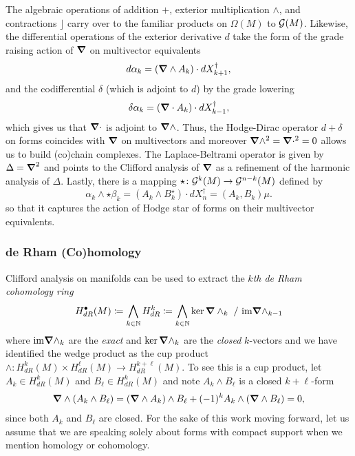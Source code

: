 \documentclass[conf]{new-aiaa}
\begin{document}
The algebraic operations of addition $+$, exterior multiplication $\wedge$, and contractions $\rfloor$ carry over to the familiar products on $\Omega(M)$ to $\mathcal{G}(M)$. Likewise, the differential operations of the exterior derivative $d$ take the form of the grade raising action of $\boldsymbol{\nabla}$ on multivector equivalents
\begin{equation}
d \alpha_k = (\boldsymbol{\nabla} \wedge A_k) \cdot dX_{k+1}^\dagger,
\end{equation}
and the codifferential $\delta$ (which is adjoint to $d$) by the grade lowering
\begin{equation}
\delta \alpha_k = (\boldsymbol{\nabla} \cdot A_k)\cdot dX_{k-1}^\dagger,
\end{equation} 
which gives us that $\boldsymbol{\nabla} \cdot$ is adjoint to $\boldsymbol{\nabla} \wedge$. Thus, the Hodge-Dirac operator $d+\delta$ on forms coincides with $\boldsymbol{\nabla}$ on multivectors and moreover $\boldsymbol{\nabla} \wedge^2 = \boldsymbol{\nabla} \cdot^2=0$ allows us to build (co)chain complexes. The Laplace-Beltrami operator is given by $\Delta = \boldsymbol{\nabla}^2$ and points to the Clifford analysis of $\boldsymbol{\nabla}$ as a refinement of the harmonic analysis of $\Delta$. Lastly, there is a mapping $\star \colon \mathcal{G}^k(M)\to \mathcal{G}^{n-k}(M)$ defined by
\begin{equation}
\alpha_k \wedge \star \beta_k = (A_k \wedge B_k^{\star})\cdot dX_n^\dagger = (A_k,B_k) \mu.
\end{equation}
so that it captures the action of Hodge star of forms on their multivector equivalents. 

\subsubsection{de Rham (Co)homology}

\label{subsubsec:derham}

Clifford analysis on manifolds can be used to extract the \emph{$k$th de Rham cohomology ring}
\begin{equation}
H^\bullet_{dR}(M) \coloneqq \bigwedge_{k \in \mathbb{N}} H^k_{dR} \coloneqq \bigwedge_{k \in \mathbb{N}} \ker \boldsymbol{\nabla} \wedge_k ~/~ \mathrm{im} \boldsymbol{\nabla} \wedge_{k-1}
\end{equation}
where $\mathrm{im} \boldsymbol{\nabla} \wedge_k$ are the \emph{exact} and $\ker \boldsymbol{\nabla} \wedge_k$ are the \emph{closed} $k$-vectors and we have identified the wedge product as the cup product $\wedge \colon H^k_{dR}(M) \times H^\ell_{dR}(M) \to H^{k+\ell}_{dR}(M)$. To see this is a cup product, let $A_k \in H^k_{dR}(M)$ and $B_\ell \in H^k_{dR}(M)$ and note $A_k \wedge B_\ell$ is a closed $k+\ell$-form
\begin{align}
\boldsymbol{\nabla} \wedge (A_k \wedge B_\ell) = (\boldsymbol{\nabla} \wedge A_k) \wedge B_\ell + (-1)^k A_k \wedge (\boldsymbol{\nabla} \wedge B_\ell) = 0,
\end{align}
since both $A_k$ and $B_\ell$ are closed. For the sake of this work moving forward, let us assume that we are speaking solely about forms with compact support when we mention homology or cohomology.
\end{document}
